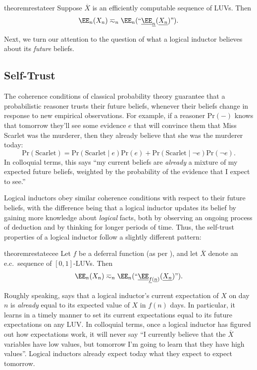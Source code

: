 \documentclass[authordate,onecolumn,noenvironments]{miri-tech-article}
\numberwithin{equation}{subsection}
\newcommand{\quot}[1]{``#1"}
\newcommand{\enc}[1]{{\underline{#1}}}
\newcommand{\seq}[1]{{\overline{#1}}}
\newcommand{\any}{-}
\newcommand{\nn}{n}
\newcommand{\deff}{f}
\newcommand{\ec}[1][\ ]{e.c.#1}
\newcommand{\li}{logical inductor}
\newcommand{\rparenthetical}[1]{\hfill\upshape{{\small (#1)}}} %
\newcommand{\proofin}[1]{\rparenthetical{Proof in:~#1.}}
\newcommand{\Bayesian}{\mathrm{Pr}}
\begin{document}
\begin{restatable}{theorem}{restateer}\label{thm:er}
 Suppose $\seq{X}$ is an efficiently computable sequence of LUVs. Then
  \[
    \EE_\nn(X_\nn)\eqsim_\nn\EE_\nn(\quot{\enc{\EE}_\enc{\nn}(\enc{X_\nn})}).
  \]
  \proofin{\ref{app:er}}
\end{restatable}

Next, we turn our attention to the question of what a \li{} believes about its \emph{future} beliefs.




\subsection{Self-Trust}\label{sec:selftrust}

The coherence conditions of classical probability theory guarantee that a probabilistic reasoner trusts their future beliefs, whenever their beliefs change in response to new empirical observations. For example, if a reasoner $\Bayesian(\any)$ knows that tomorrow they'll see some evidence $e$ that will convince them that Miss Scarlet was the murderer, then they already believe that she was the murderer today:
\[
  \Bayesian(\mathrm{Scarlet}) = \Bayesian(\mathrm{Scarlet}\mid e) \Bayesian(e) + \Bayesian(\mathrm{Scarlet}\mid \lnot e) \Bayesian(\lnot e).
\]
In colloquial terms, this says ``my current beliefs are \emph{already} a mixture of my expected future beliefs, weighted by the probability of the evidence that I expect to see.''

Logical inductors obey similar coherence conditions with respect to their future beliefs, with the difference being that a logical inductor updates its belief by gaining more knowledge about \emph{logical} facts, both by observing an ongoing process of deduction and by thinking for longer periods of time. Thus, the self-trust properties of a logical inductor follow a slightly different pattern:

\begin{restatable}{theorem}{restatecee}\label{thm:cee}
  Let $\deff$ be a deferral function (as per ), and let $\seq{X}$ denote an \ec sequence of $[0,1]$-LUVs. Then
  \[
    \EE_\nn(X_\nn) \eqsim_\nn
    \EE_\nn(\quot{\enc{\EE}_{\enc{\deff}(\enc{\nn})}(\enc{X_\nn})}).
  \]
  \proofin{\ref{app:cee}}
\end{restatable}
\noindent Roughly speaking,  says that a logical inductor's current expectation of $X$ on day $\nn$ is \emph{already} equal to its expected value of $X$ in $\deff(\nn)$ days. In particular, it learns in a timely manner to set its current expectations equal to its future expectations on any LUV\@. In colloquial terms, once a logical inductor has figured out how expectations work, it will never say ``I currently believe that the $\seq{X}$ variables have low values, but tomorrow I'm going to learn that they have high values''. Logical inductors already expect today what they expect to expect tomorrow.
\end{document}
